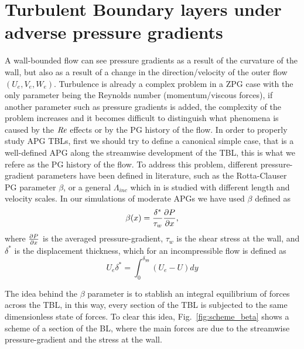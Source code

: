 
\section{Turbulent Boundary layers under adverse pressure gradients}

A wall-bounded flow can see pressure gradients as a result of the curvature of the wall, but also as a result of a change in the direction/velocity of the outer flow $(U_{e}, V_{e}, W_{e})$. Turbulence is already a complex problem in a ZPG case with the only parameter being the Reynolds number (momentum/viscous forces), if another parameter such as pressure gradients is added, the complexity of the problem increases and it becomes difficult to distinguish what phenomena is caused by the $\mbox{\textit{Re}}$ effects or by the PG history of the flow.
In order to properly study APG TBLs, first we should try to define a canonical simple case, that is a well-defined APG along the streamwise development of the TBL, this is what we refere as the PG history of the flow.
To address this problem, different pressure-gradient parameters have been defined in literature, such as the Rotta-Clauser PG parameter $\beta$, or a general $\Lambda_{inc}$ which in \cite{Gibis2019} is studied with different length and velocity scales.
In our simulations of moderate APGs we have used $\beta$ defined as
\begin{equation}
    \beta(x) = \frac{\delta^*}{\tau_w} \pdv{P}{x},
\end{equation}
where $\pdv{P}{x}$ is the averaged pressure-gradient, $\tau_w$ is the shear stress at the wall, and $\delta^*$ is the displacement thickness, which for an incompressible flow is defined as
\begin{equation}
    U_e \delta^* = \int_{0}^{\delta_{99}} (U_e - U) dy
\end{equation}

The idea behind the $\beta$ parameter is to stablish an integral equilibrium of forces across the TBL, in this way, every section of the TBL is subjected to the same dimensionless state of forces.
To clear this idea, Fig.~\ref{fig:scheme_beta} shows a scheme of a section of the BL, where the main forces are due to the streamwise pressure-gradient and the stress at the wall.

